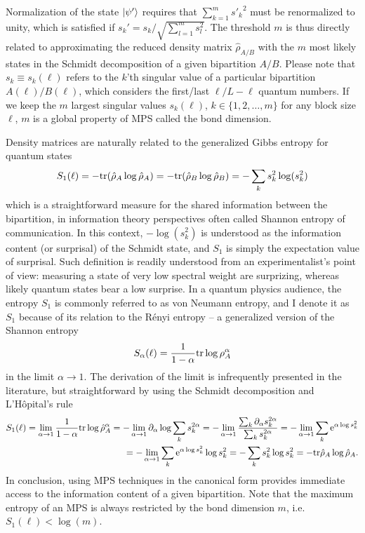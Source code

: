 Normalization of the state $\ket{\psi'}$ requires that $\sum_{k=1}^m {s'_k}^2$ must be renormalized to unity, which is satisfied if $s_k'=s_k/\sqrt{\sum_{l=1}^m s_l^2}$.
The threshold $m$ is thus directly related to approximating the reduced density matrix $\hat \rho_{A/B}$ with the $m$ most likely states in the Schmidt decomposition of a given bipartition $A/B$.
Please note that $s_k\equiv s_k(\ell)$ refers to the $k$'th singular value of a particular bipartition $A(\ell)/B(\ell)$, which considers the first/last $\ell/L-\ell$ quantum numbers.
If we keep the $m$ largest singular values $s_k(\ell)$, $k\in\{1,2,\dots,m\}$ for any block size $\ell$, $m$ is a global property of MPS called the bond dimension.

Density matrices are naturally related to the generalized Gibbs entropy for quantum states
\begin{align}
    S_1(\ell) = -{\rm tr}(\hat\rho_A\log\hat\rho_A) = -{\rm tr}(\hat\rho_B\log\hat\rho_B) = -\sum_k s^2_k\log(s^2_k)
\end{align}
which is a straightforward measure for the shared information between the bipartition, in information theory perspectives often called Shannon entropy of communication.
In this context, $-\log(s^2_k)$ is understood as the information content (or surprisal) of the Schmidt state, and $S_1$ is simply the expectation value of surprisal.
Such definition is readily understood from an experimentalist's point of view: measuring a state of very low spectral weight are surprizing, whereas likely quantum states bear a low surprise.
In a quantum physics audience, the entropy $S_1$ is commonly referred to as von Neumann entropy, and I denote it as $S_1$ because of its relation to the Rényi entropy -- a generalized version of the Shannon entropy
\begin{align}
    S_\alpha(\ell) = \frac{1}{1-\alpha}{\rm tr}\log\rho^\alpha_A
\end{align}
in the limit $\alpha\rightarrow1$.
The derivation of the limit is infrequently presented in the literature, but straightforward by using the Schmidt decomposition and L'Hôpital's rule
\begin{align}
    S_1(\ell)
    =
    \lim_{\alpha\rightarrow1}\frac1{1-\alpha}{\rm tr}\log\hat\rho_A^\alpha
    =
    -\lim_{\alpha\rightarrow1}\partial_\alpha\log\sum_k s_k^{2\alpha}
    =
    -\lim_{\alpha\rightarrow1}\frac{\sum_k\partial_\alpha s_k^{2\alpha}}{\sum_k s_k^{2\alpha}}
    =
    -\lim_{\alpha\rightarrow1}\sum_k \mathrm e^{\alpha\log s_k^2}
    \\
    =
    -\lim_{\alpha\rightarrow1}\sum_k \mathrm e^{\alpha\log s_k^2}\log s_k^2
    =
    -\sum_k s_k^2\log s_k^2
    =
    -{\rm tr} \hat\rho_A\log\hat\rho_A.
\end{align}
In conclusion, using MPS techniques in the canonical form provides immediate access to the information content of a given bipartition.
Note that the maximum entropy of an MPS is always restricted by the bond dimension $m$, i.e. $S_1(\ell)<\log(m)$.
%
%
